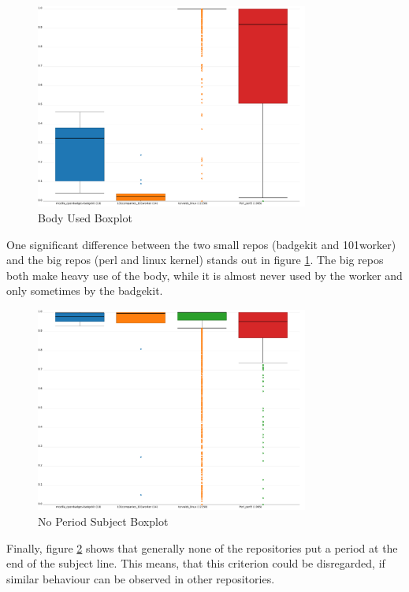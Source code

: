 \begin{figure}[p]
    \centering
    \includegraphics[width=0.8\textwidth]{img/body_used.pdf}
    \caption{Body Used Boxplot}
    \label{fig:bp_body_used}
\end{figure}

One significant difference between the two small repos (badgekit and 101worker) and the big repos (perl and linux kernel) stands out in figure \ref{fig:bp_body_used}. The big repos both make heavy use of the body, while it is almost never used by the worker and only sometimes by the badgekit.

\begin{figure}[p]
    \centering
    \includegraphics[width=0.8\textwidth]{img/no_period_subject.pdf}
    \caption{No Period Subject Boxplot}
    \label{fig:bp_no_period_subject}
\end{figure}

Finally, figure \ref{fig:bp_no_period_subject} shows that generally none of the repositories put a period at the end of the subject line. This means, that this criterion could be disregarded, if similar behaviour can be observed in other repositories.


